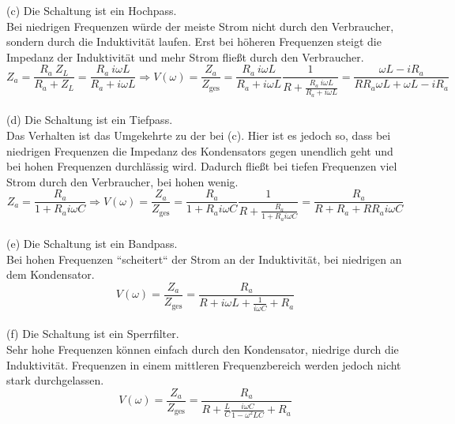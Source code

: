 \documentclass[11pt a4paper]{article}
\begin{document}
(c) Die Schaltung ist ein Hochpass. \\
Bei niedrigen Frequenzen würde der meiste Strom nicht durch den Verbraucher, sondern durch die Induktivität laufen.
Erst bei höheren Frequenzen steigt die Impedanz der Induktivität und mehr Strom fließt durch den Verbraucher.
\[
	Z_a = \frac{R_a \ Z_L}{R_a + Z_L} = \frac{R_a \ i\omega L}{R_a + i\omega L} 
	\Rightarrow 
	V(\omega) = \frac{Z_a}{Z_\text{ges}} 
	= \frac{R_a \ i\omega L}{R_a + i\omega L} \frac{1}{R + \frac{R_a \ i\omega L}{R_a + i\omega L}}
	= \frac{\omega L - iR_a}{R R_a \omega L + \omega L - iR_a}
\]
\\

(d) Die Schaltung ist ein Tiefpass. \\
Das Verhalten ist das Umgekehrte zu der bei (c). Hier ist es jedoch so, dass bei niedrigen Frequenzen die Impedanz
des Kondensators gegen unendlich geht und bei hohen Frequenzen durchlässig wird. Dadurch fließt bei tiefen
Frequenzen viel Strom durch den Verbraucher, bei hohen wenig.
\[
	Z_a = \frac{R_a}{1 + R_a i\omega C}
	\Rightarrow 
	V(\omega) = \frac{Z_a}{Z_\text{ges}} 
	= \frac{R_a}{1 + R_a i\omega C} \frac{1}{R + \frac{R_a}{1 + R_a i\omega C}}
	= \frac{R_a}{R + R_a + RR_a i\omega C}
\]
\\

(e) Die Schaltung ist ein Bandpass. \\
Bei hohen Frequenzen ``scheitert`` der Strom an der Induktivität, bei niedrigen an dem Kondensator.
\[
	V(\omega) = \frac{Z_a}{Z_\text{ges}} = \frac{R_a}{R + i\omega L + \frac{1}{i \omega C} + R_a}
\]
\\

(f) Die Schaltung ist ein Sperrfilter. \\
Sehr hohe Frequenzen können einfach durch den Kondensator, niedrige durch die Induktivität. Frequenzen in einem
mittleren Frequenzbereich werden jedoch nicht stark durchgelassen.
\[
	V(\omega) = \frac{Z_a}{Z_\text{ges}} 
	= \frac{R_a}{R + \frac{L}{C} \frac{i\omega C}{1 - \omega^2 LC} + R_a}
\]
\end{document}
